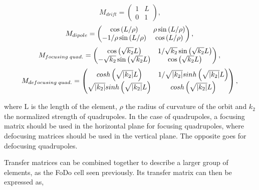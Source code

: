 \begin{equation}
    M_{drift} = \begin{pmatrix}
                    1 & L \\
                    0 & 1 
                \end{pmatrix},
\end{equation}
\begin{equation}
    M_{dipole} = \begin{pmatrix}
                    \cos\left(L/\rho\right) & \rho \sin\left(L/\rho\right) \\
                    -1/\rho \sin\left(L/\rho\right) & \cos\left(L/\rho\right)
                 \end{pmatrix}, \\
\end{equation}
\begin{equation}
    M_{focusing\;quad.} = \begin{pmatrix}
                             \cos\left(\sqrt{k_2}L\right) & 1/\sqrt{k_2} \sin\left(\sqrt{k_2}L\right) \\
                             -\sqrt{k_2}\sin\left(\sqrt{k_2}L\right) & \cos\left(\sqrt{k_2}L\right)
                          \end{pmatrix},\\
\end{equation}
\begin{equation}
    M_{defocusing\;quad.} = \begin{pmatrix}
                        cosh\left(\sqrt{|k_2|}L \right) & 1/\sqrt{|k_2|} sinh\left(\sqrt{|k_2|} L\right) \\
                        \sqrt{|k_2|} sinh\left(\sqrt{|k_2|} L\right) & cosh\left(\sqrt{|k_2|} L \right)
                            \end{pmatrix},\\
\end{equation}

where L is the length of the element, $\rho$ the radius of curvature of the orbit and $k_2$ the
normalized strength of quadrupoles. In the case of quadrupoles, a focusing matrix should be used in
the horizontal plane for focusing quadrupoles, where defocusing matrices should be used in the
vertical plane. The opposite goes for defocusing quadrupoles.

Transfer matrices can be combined together to describe a larger group of elements, as the FoDo cell
seen previously. Its transfer matrix can then be expressed as,

